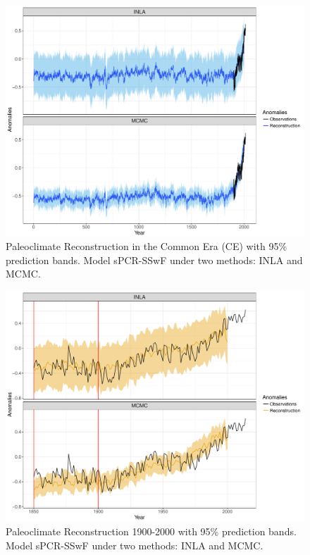 \documentclass[11pt]{amsart}
\theoremstyle{plain}
\theoremstyle{definition}
\theoremstyle{remark}
\begin{document}
\begin{figure}[H]
  \centering
  \includegraphics[scale=0.35]{RecCE_MCMC}
  \caption{Paleoclimate Reconstruction in the Common Era (CE) with 95\%
    prediction bands. Model sPCR-SSwF under two methods: INLA and MCMC.}
  \label{fig:paleoCE4}
\end{figure}

\begin{figure}[H]
  \centering
  \includegraphics[scale=0.35]{Rec1900_MCMC}
  \caption{Paleoclimate Reconstruction 1900-2000 with 95\%
    prediction bands. Model sPCR-SSwF under two methods: INLA and MCMC.}
  \label{fig:paleo19004}
\end{figure}
\end{document}
